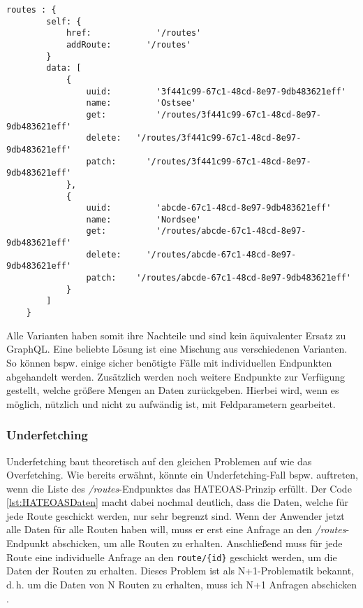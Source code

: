 \vspace{-1pt}%

\begin{lstlisting}[caption={Beispielliste der Routen mit HATEOAS},captionpos=b,label=lst:HATEOASDaten]
	routes : {
		self: {
			href:			  '/routes'
			addRoute:		'/routes'
		}
		data: [
			{
				uuid:		  '3f441c99-67c1-48cd-8e97-9db483621eff'
				name:		  'Ostsee'
				get:		  '/routes/3f441c99-67c1-48cd-8e97-9db483621eff'
				delete:	  '/routes/3f441c99-67c1-48cd-8e97-9db483621eff'
				patch:		'/routes/3f441c99-67c1-48cd-8e97-9db483621eff'
			},
			{
				uuid:		  'abcde-67c1-48cd-8e97-9db483621eff'
				name:		  'Nordsee'
				get: 		  '/routes/abcde-67c1-48cd-8e97-9db483621eff'
				delete: 	'/routes/abcde-67c1-48cd-8e97-9db483621eff'
				patch: 	  '/routes/abcde-67c1-48cd-8e97-9db483621eff'
			}
		]
	}
\end{lstlisting}


Alle Varianten haben somit ihre Nachteile und sind kein äquivalenter Ersatz zu GraphQL. Eine beliebte Lösung ist eine Mischung aus verschiedenen Varianten. So können bspw. einige sicher benötigte Fälle mit individuellen Endpunkten abgehandelt werden. Zusätzlich werden noch weitere Endpunkte zur Verfügung gestellt, welche größere Mengen an Daten zurückgeben. Hierbei wird, wenn es möglich, nützlich und nicht zu aufwändig ist, mit Feldparametern gearbeitet.

\subsubsection{Underfetching}\label{underfetching}

Underfetching baut theoretisch auf den gleichen Problemen auf wie das Overfetching. Wie bereits erwähnt, könnte ein Underfetching-Fall bspw. auftreten, wenn die Liste des \textit{/routes}-Endpunktes das \ac{HATEOAS}-Prinzip erfüllt. Der Code \ref{lst:HATEOASDaten} macht dabei nochmal deutlich, dass die Daten, welche für jede Route geschickt werden, nur sehr begrenzt sind. Wenn der Anwender jetzt alle Daten für alle Routen haben will, muss er erst eine Anfrage an den  \textit{/routes}-Endpunkt abschicken, um alle Routen zu erhalten. Anschließend muss für jede Route eine individuelle Anfrage an den \verb+route/{id}+ geschickt werden, um die Daten der Routen zu erhalten. Dieses Problem ist als N+1-Problematik bekannt, d.\,h. um die Daten von N Routen zu erhalten, muss ich N+1 Anfragen abschicken \parencite{Kheyrollahi2014}.

